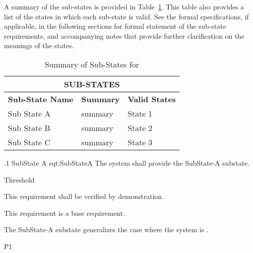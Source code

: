 A summary of the sub-states is provided in Table~\ref{tab:SubStates}.
This table also provides a list of the states in which each sub-state is valid.
See the formal specifications, if applicable, in the following sections for formal statement of the sub-state requirements, and accompanying notes that provide further clarification on the meanings of the states.
\begin{table}[h]
	\begin{center}
		\begin{tabular}{|p{1.0in}|p{4.0in}|p{1.0in}|}
			\hline
			\hline
			\multicolumn{3}{|c|}{{\bf SUB-STATES}} \\
			\hline
				{\bf Sub-State Name} & {\bf Summary} & {\bf Valid States} \\ 
			\hline
			\hline
Sub State A & summary & State 1 \\ \hline
Sub State B & summary & State 2 \\ \hline
Sub State C & summary & State 3 \\ 
			\hline
			\hline
		\end{tabular}
		\caption{Summary of Sub-States for \ThisSystem}
		\label{tab:SubStates}
	\end{center}
\end{table}


\ONERQMTV
{\RqtNumberBase.1}
{SubState A}
{rqt:SubStateA}
{The system shall provide the SubState-A substate.}
{
	\item [Phase 1] Threshold
}
{This requirement shall be verified by demonstration.}
{
	\item [N/A] This requirement is a base requirement.
}
{
	\item The SubState-A substate generalizes the case where the system is \TBD.
}
{P1}

